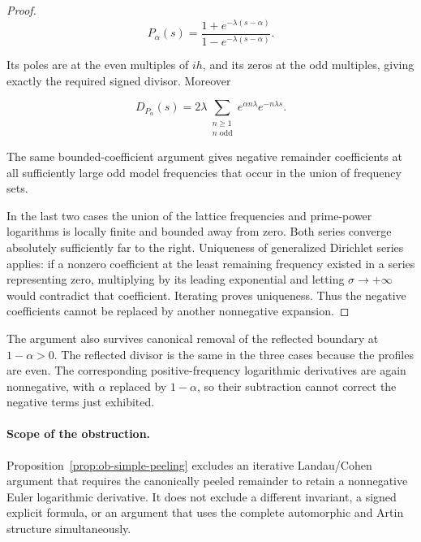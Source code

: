 \begin{proof}
\begin{equation}\label{eq:ob3-6}
P_\alpha(s)=
\frac{1+e^{-\lambda(s-\alpha)}}{1-e^{-\lambda(s-\alpha)}}.
\end{equation}

Its poles are at the even multiples of \(ih\), and its zeros at the odd multiples, giving exactly the required signed divisor. Moreover

\begin{equation}\label{eq:ob3-7}
D_{P_\alpha}(s)=2\lambda
\sum_{\substack{n\ge1\\n\text{ odd}}}
e^{\alpha n\lambda}e^{-n\lambda s}.
\end{equation}

The same bounded-coefficient argument gives negative remainder coefficients at all sufficiently large odd model frequencies that occur in the union of frequency sets.

In the last two cases the union of the lattice frequencies and prime-power logarithms is locally finite and bounded away from zero. Both series converge absolutely sufficiently far to the right. Uniqueness of generalized Dirichlet series applies: if a nonzero coefficient at the least remaining frequency existed in a series representing zero, multiplying by its leading exponential and letting \(\sigma\to+\infty\) would contradict that coefficient. Iterating proves uniqueness. Thus the negative coefficients cannot be replaced by another nonnegative expansion. \end{proof}

The argument also survives canonical removal of the reflected boundary at \(1-\alpha>0\). The reflected divisor is the same in the three cases because the profiles are even. The corresponding positive-frequency logarithmic derivatives are again nonnegative, with \(\alpha\) replaced by \(1-\alpha\), so their subtraction cannot correct the negative terms just exhibited.

\paragraph{Scope of the obstruction.} Proposition~\ref{prop:ob-simple-peeling} excludes an iterative Landau/Cohen argument that requires the canonically peeled remainder to retain a nonnegative Euler logarithmic derivative. It does not exclude a different invariant, a signed explicit formula, or an argument that uses the complete automorphic and Artin structure simultaneously.

